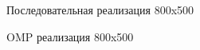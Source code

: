 \documentclass{report}
\begin{document}
\begin{figure}[H]
\caption{Последовательная реализация 800x500}
\end{figure}

\begin{figure}[H]
\caption{OMP реализация 800x500}
\end{figure}
\end{document}
